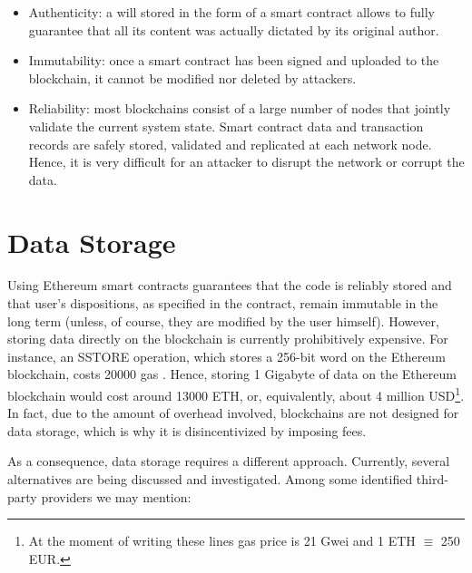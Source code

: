 \begin{itemize}
	\item Authenticity: a will stored in the form of a smart contract allows to fully guarantee that all its content was actually dictated by its original author.
	\item Immutability: once a smart contract has been signed and uploaded to the blockchain, it cannot be modified nor deleted by attackers.
	\item Reliability: most blockchains consist of a large number of nodes that jointly validate the current system state. Smart contract data and transaction records are safely stored, validated and replicated at each network node. Hence, it is very difficult for an attacker to disrupt the network or corrupt the data.
\end{itemize}



\section{Data Storage} %
\label{sec:data_storage}
Using Ethereum smart contracts guarantees that the code is reliably stored and that user's dispositions, as specified in the contract, remain immutable in the long term (unless, of course, they are modified by the user himself). However, storing data directly on the blockchain is currently prohibitively expensive.
For instance, an SSTORE operation, which stores a 256-bit word on the Ethereum blockchain, costs 20000 gas \cite[Appendix G]{Wood}. Hence, storing 1 Gigabyte of data on the Ethereum blockchain would cost around 13000 ETH, or, equivalently, about 4 million USD\footnote{At the moment of writing these lines gas price is 21 Gwei and 1 ETH $\equiv$ 250 EUR.}.
In fact, due to the amount of overhead involved, blockchains are not designed for data storage, which is why it is disincentivized by imposing fees. 

As a consequence, data storage requires a different approach. Currently, several alternatives are being discussed and investigated.
Among some identified third-party providers we may mention:


